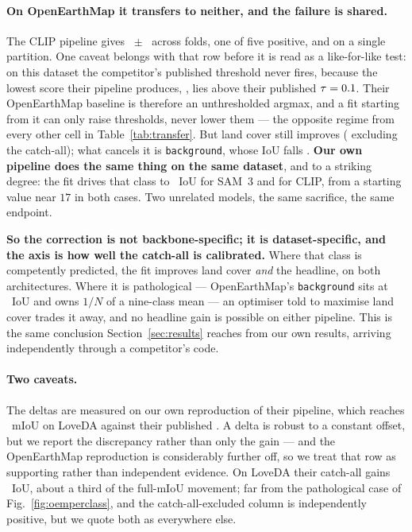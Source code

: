 \documentclass[10pt,a4paper]{article}                        %
\newcommand{\best}[1]{\textbf{#1}}
\newcommand{\bg}{\texttt{background}}
\begin{document}
\paragraph{On OpenEarthMap it transfers to neither, and the failure is shared.}
The CLIP pipeline gives \cnOemCV{}~$\pm$~\cnOemCVsd{} across folds, one of five
positive, and \cnOemFull{} on a single partition. One caveat belongs with that row
before it is read as a like-for-like test: on this dataset the competitor's
published threshold never fires, because the lowest score their pipeline produces,
\cnOemFloor{}, lies above their published $\tau=0.1{}$. Their OpenEarthMap
baseline is therefore an unthresholded argmax, and a fit starting from it can only
raise thresholds, never lower them --- the opposite regime from every other cell in
Table~\ref{tab:transfer}.
But land cover still improves (\cnOemReal{} excluding the catch-all); what cancels
it is \bg{}, whose IoU falls \cnOemBg{}. \best{Our own pipeline does the same thing
on the same dataset}, and to a striking degree: the fit drives that class to
\mrOemBgAfter{}~IoU for SAM~3 and \cnOemBgAfter{} for CLIP, from a starting value
near $17$ in both cases. Two unrelated models, the same sacrifice, the same
endpoint.

\best{So the correction is not backbone-specific; it is dataset-specific, and the
axis is how well the catch-all is calibrated.} Where that class is competently
predicted, the fit improves land cover \emph{and} the headline, on both
architectures. Where it is pathological --- OpenEarthMap's \bg{} sits at
\mrOemBgIoU{}~IoU and owns $1/N$ of a nine-class mean --- an optimiser told to
maximise land cover trades it away, and no headline gain is possible on either
pipeline. This is the same conclusion Section~\ref{sec:results} reaches from our
own results, arriving independently through a competitor's code.

\paragraph{Two caveats.} The deltas are measured on our own reproduction of their
pipeline, which reaches \cnRepro{}~mIoU on LoveDA against their published \cnPub{}.
A delta is robust to a constant offset, but we report the discrepancy rather than
only the gain --- and the OpenEarthMap reproduction is considerably further off, so
we treat that row as supporting rather than independent evidence. On LoveDA their
catch-all gains \cnBg{}~IoU, about a third of the full-mIoU movement; far from the
pathological case of Fig.~\ref{fig:oemperclass}, and the catch-all-excluded column
is independently positive, but we quote both as everywhere else.
\end{document}

